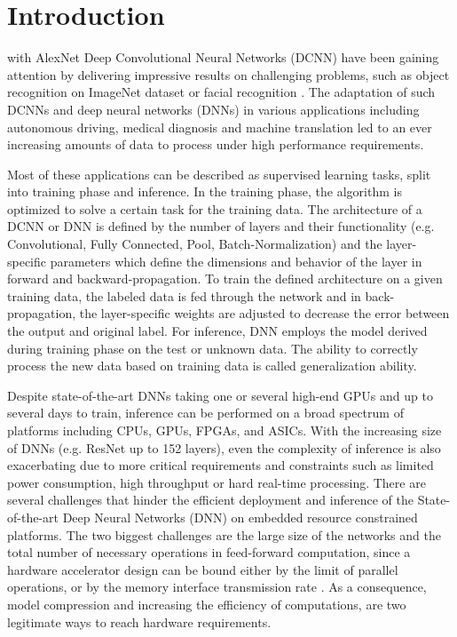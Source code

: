 \section{Introduction}
\label{sec:intro}
 with AlexNet \cite{Krizhevsky2012} Deep Convolutional Neural Networks (DCNN) have been gaining attention by delivering impressive results on challenging problems, such as object recognition on ImageNet dataset \cite{Deng2009} or facial recognition \cite{Taigman2014}. 
The adaptation of such DCNNs and deep neural networks (DNNs) in various 
applications including autonomous driving, medical diagnosis \cite{Rajpurkar2017} and machine translation \cite{Zhang2015a} led to an 
ever increasing amounts of data to process under high performance requirements. 

Most of these applications can be described as supervised learning tasks, 
split into training phase and inference. In the training phase, 
the algorithm is optimized to solve a certain task for the training data. The 
architecture of a DCNN or DNN is defined by the number of layers and their 
functionality (e.g. Convolutional, Fully Connected, Pool, Batch-Normalization) 
and the layer-specific parameters which define the dimensions and behavior of the 
layer in forward and backward-propagation. To train the defined architecture on a 
given training data, the labeled data is fed through the network and 
in back-propagation, the layer-specific weights are adjusted to decrease the error between the output and original label. For inference, DNN employs the model derived during training phase on the test or unknown data. 
The ability to correctly process the new data based on training data
is called generalization ability.

Despite state-of-the-art DNNs taking one or several high-end GPUs 
and up to several days to train, inference can be performed on 
a broad spectrum of platforms including CPUs, GPUs, FPGAs, and ASICs. 
With the increasing size of DNNs (e.g. ResNet \cite{He2016} up to 152 layers), even the complexity of inference is also exacerbating 
due to more critical requirements and constraints such as limited power consumption, high throughput or hard real-time processing. 
There are several challenges that hinder the efficient deployment and 
inference of the State-of-the-art Deep Neural Networks (DNN) on embedded 
resource constrained platforms. The two biggest challenges are the 
large size of the networks and the total number of necessary operations in feed-forward computation, since a hardware accelerator design can be bound either by the limit of parallel operations, or by the memory interface transmission rate \cite{Zhang2015}. As a consequence, model compression and increasing the efficiency of computations, are two legitimate ways to reach hardware requirements.

